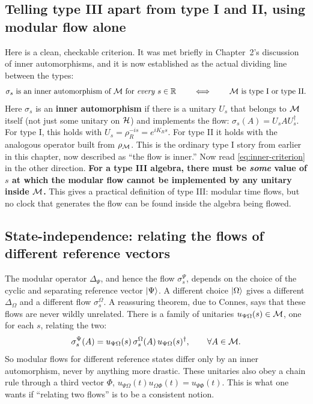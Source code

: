 \subsection*{Telling type III apart from type I and II, using modular flow alone}

Here is a clean, checkable criterion. It was met briefly in Chapter~2's discussion of inner automorphisms, and
it is now established as the actual dividing line between the types:
\begin{equation}
\sigma_s \text{ is an inner automorphism of } \mathcal{M} \text{ for \emph{every} } s\in\mathbb R
\qquad \iff \qquad \mathcal{M} \text{ is type I or type II} .
\label{eq:inner-criterion}
\end{equation}
Here $\sigma_s$ is an \textbf{inner automorphism} if there is a unitary $U_s$ that belongs to $\mathcal{M}$ itself (not
just some unitary on $\mathcal{H}$) and implements the flow: $\sigma_s(A)=U_sAU_s^\dagger$. For type I, this holds with
$U_s=\rho_R^{-is}=e^{iK_Rs}$. For type II it holds with the analogous operator built from $\rho_{\mathcal{M}}$. This is
the ordinary type I story from earlier in this chapter, now described as ``the flow is inner.'' Now read
\eqref{eq:inner-criterion} in the other direction. \textbf{For a type III algebra, there must be \emph{some}
value of $s$ at which the modular flow cannot be implemented by any unitary inside $\mathcal{M}$.} This gives a
practical definition of type III: modular time flows, but no clock that generates the flow can be found inside
the algebra being flowed.

\subsection*{State-independence: relating the flows of different reference vectors}

The modular operator $\Delta_\Psi$, and hence the flow $\sigma_s^\Psi$, depends on the choice of the cyclic and
separating reference vector $\ket\Psi$. A different choice $\ket\Omega$ gives a different $\Delta_\Omega$ and a
different flow $\sigma_s^\Omega$. A reassuring theorem, due to Connes, says that these flows are never wildly
unrelated. There is a family of unitaries $u_{\Psi\Omega}(s)\in\mathcal{M}$, one for each $s$, relating the two:
\begin{equation}
\sigma_s^\Psi(A) = u_{\Psi\Omega}(s)\,\sigma_s^\Omega(A)\,u_{\Psi\Omega}(s)^\dagger, \qquad \forall A\in\mathcal{M} .
\label{eq:cocycle}
\end{equation}
So modular flows for different reference states differ only by an inner automorphism, never by anything more
drastic. These unitaries also obey a chain rule through a third vector $\Phi$,
$u_{\Psi\Omega}(t)u_{\Omega\Phi}(t)=u_{\Psi\Phi}(t)$. This is what one wants if ``relating two flows'' is to be
a consistent notion.

